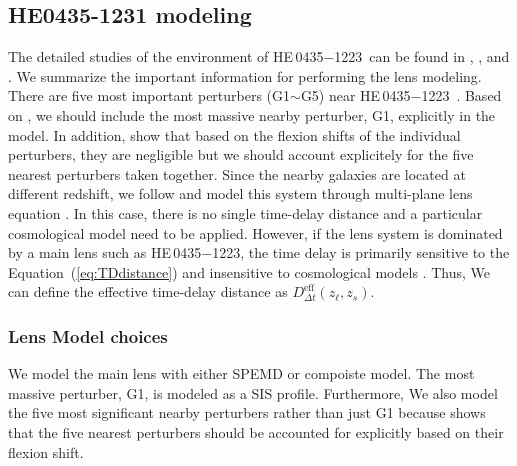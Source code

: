 \documentclass[useAMS,usenatbib]{mnras}
\newcommand\he{HE\,0435$-$1223}
\newcommand{\eref}[1]{Equation~(\ref{#1})}
\def\zl{z_{\ell}}
\def\zs{z_{s}}
\newcommand{\Ddt}{D_{\Delta t}}
\begin{document}
\subsection{HE0435-1231 modeling}
\label{subsec:HEmodeling}
The detailed studies of the environment of \he~can be found in \citet{SluseEtal17}, \citet{RusuEtal17}, and \citet{TihhonovaEtal17}. 
We summarize the important information for performing the lens modeling. 
There are five most important perturbers (G1$\sim$G5) near \he~\citep[see Fig. 3 in][]{WongEtal17}. Based on \citet{McCullyEtal14,McCullyEtal17}, we should include the most massive nearby perturber, G1, explicitly in the model. In addition, \citet{SluseEtal17} show that based on the flexion shifts of the individual perturbers, they are negligible but we should account explicitely for the five nearest perturbers taken together. Since the nearby galaxies are located at different redshift, we follow \citet{WongEtal17} and model this system through multi-plane lens equation \citep[e.g.,][]{BlandfordNarayan86,SEF92,Collett&Auger14,McCullyEtal14,WongEtal17}. In this case, there is no single time-delay distance and a particular cosmological model need to be applied. However, if the lens system is dominated by a main lens such as \he, the time delay is primarily sensitive to the \eref{eq:TDdistance} and insensitive to cosmological models \citep{WongEtal17}. Thus, We can define the effective time-delay distance as $\Ddt^{\textrm{eff}}\left(\zl,\zs\right)$.

\subsubsection{Lens Model choices}
We model the main lens with either SPEMD or compoiste model. 
The most massive perturber, G1, is modeled as a SIS profile. Furthermore, We also model the five most significant nearby perturbers rather than just G1 because \citet{SluseEtal17} shows that the five nearest perturbers should be accounted for explicitly based on their flexion shift.
\end{document}
